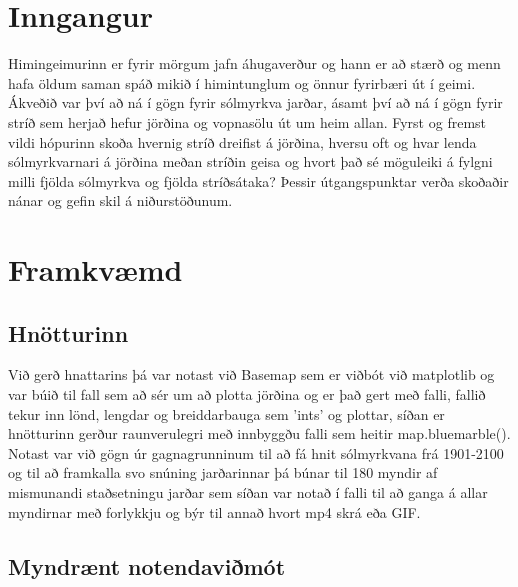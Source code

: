 \documentclass[12pt, git, final]{rureport}
\begin{document}
\maketitle  %


%
\section{Inngangur} %
Himingeimurinn er fyrir mörgum jafn áhugaverður og hann er að stærð og menn hafa öldum saman spáð mikið í himintunglum og önnur fyrirbæri út í geimi. Ákveðið var því að ná í gögn fyrir sólmyrkva jarðar, ásamt því að ná í gögn fyrir stríð  sem herjað hefur jörðina og vopnasölu út um heim allan. Fyrst og fremst vildi hópurinn skoða hvernig stríð dreifist á jörðina, hversu oft og hvar lenda sólmyrkvarnari á jörðina meðan stríðin geisa og hvort það sé möguleiki á fylgni milli fjölda sólmyrkva og fjölda stríðsátaka? Þessir útgangspunktar verða skoðaðir nánar og gefin skil á niðurstöðunum. 
\section{Framkvæmd}
\subsection{Hnötturinn}
Við gerð hnattarins þá var notast við Basemap sem er viðbót við matplotlib og var búið til fall sem að sér um að plotta jörðina og er það gert með falli, fallið tekur inn lönd, lengdar og breiddarbauga sem 'ints' og plottar, síðan er hnötturinn gerður raunverulegri með innbyggðu falli sem heitir map.bluemarble(). Notast var við gögn úr gagnagrunninum til að fá hnit sólmyrkvana frá 1901-2100 og til að framkalla svo snúning jarðarinnar þá búnar til 180 myndir af mismunandi staðsetningu jarðar sem síðan var notað í falli til að ganga á allar myndirnar með forlykkju og býr til annað hvort mp4 skrá eða GIF.

 
\subsection{Myndrænt notendaviðmót}
\end{document}
